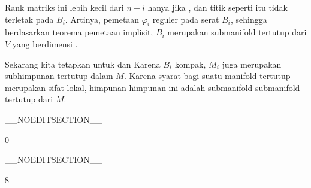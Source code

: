 {Rank matriks ini lebih kecil dari $n-i$ hanya jika
, dan titik seperti itu tidak terletak pada $B_i$. Artinya, pemetaan $\varphi_i$ reguler pada serat $B_i$, sehingga berdasarkan teorema pemetaan implisit, $B_i$ merupakan submanifold tertutup dari $V$ yang berdimensi
.

Sekarang kita tetapkan
 untuk
 dan
 Karena $B_i$ kompak, $M_i$ juga merupakan subhimpunan tertutup dalam $M$. Karena syarat bagi suatu manifold tertutup merupakan sifat lokal, himpunan-himpunan ini adalah submanifold-submanifold tertutup dari $M$.

 }

__NOEDITSECTION__

{0}

{

}
{  }

__NOEDITSECTION__

{8}

